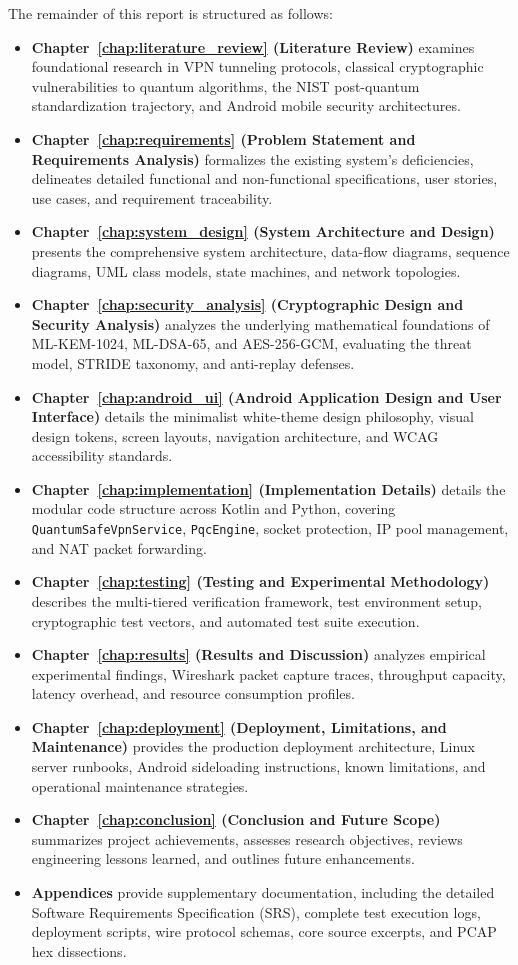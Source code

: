 The remainder of this report is structured as follows:
\begin{itemize}
    \item \textbf{Chapter~\ref{chap:literature_review} (Literature Review)} examines foundational research in VPN tunneling protocols, classical cryptographic vulnerabilities to quantum algorithms, the NIST post-quantum standardization trajectory, and Android mobile security architectures.
    \item \textbf{Chapter~\ref{chap:requirements} (Problem Statement and Requirements Analysis)} formalizes the existing system's deficiencies, delineates detailed functional and non-functional specifications, user stories, use cases, and requirement traceability.
    \item \textbf{Chapter~\ref{chap:system_design} (System Architecture and Design)} presents the comprehensive system architecture, data-flow diagrams, sequence diagrams, UML class models, state machines, and network topologies.
    \item \textbf{Chapter~\ref{chap:security_analysis} (Cryptographic Design and Security Analysis)} analyzes the underlying mathematical foundations of ML-KEM-1024, ML-DSA-65, and AES-256-GCM, evaluating the threat model, STRIDE taxonomy, and anti-replay defenses.
    \item \textbf{Chapter~\ref{chap:android_ui} (Android Application Design and User Interface)} details the minimalist white-theme design philosophy, visual design tokens, screen layouts, navigation architecture, and WCAG accessibility standards.
    \item \textbf{Chapter~\ref{chap:implementation} (Implementation Details)} details the modular code structure across Kotlin and Python, covering \texttt{QuantumSafeVpnService}, \texttt{PqcEngine}, socket protection, IP pool management, and NAT packet forwarding.
    \item \textbf{Chapter~\ref{chap:testing} (Testing and Experimental Methodology)} describes the multi-tiered verification framework, test environment setup, cryptographic test vectors, and automated test suite execution.
    \item \textbf{Chapter~\ref{chap:results} (Results and Discussion)} analyzes empirical experimental findings, Wireshark packet capture traces, throughput capacity, latency overhead, and resource consumption profiles.
    \item \textbf{Chapter~\ref{chap:deployment} (Deployment, Limitations, and Maintenance)} provides the production deployment architecture, Linux server runbooks, Android sideloading instructions, known limitations, and operational maintenance strategies.
    \item \textbf{Chapter~\ref{chap:conclusion} (Conclusion and Future Scope)} summarizes project achievements, assesses research objectives, reviews engineering lessons learned, and outlines future enhancements.
    \item \textbf{Appendices} provide supplementary documentation, including the detailed Software Requirements Specification (SRS), complete test execution logs, deployment scripts, wire protocol schemas, core source excerpts, and PCAP hex dissections.
\end{itemize}
